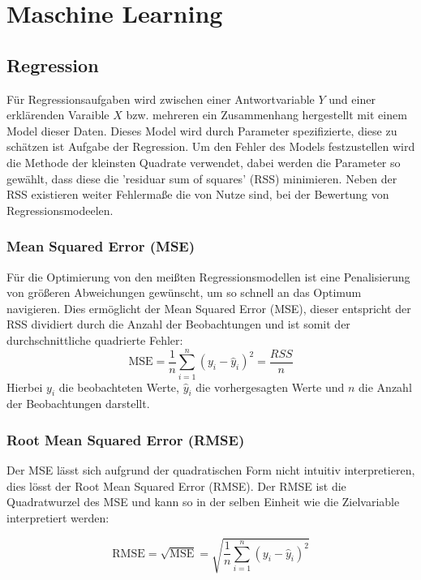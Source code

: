 
\section{Maschine Learning}
\label{sec:maschinelearning}
\subsection{Regression}
Für Regressionsaufgaben wird zwischen einer Antwortvariable \(Y\) und einer erklärenden Varaible \(X\) bzw. mehreren ein Zusammenhang hergestellt mit einem Model dieser Daten. Dieses Model wird durch Parameter spezifizierte, diese zu schätzen ist Aufgabe der Regression. Um den Fehler des Models festzustellen wird die Methode der kleinsten Quadrate verwendet, dabei werden die Parameter so gewählt, dass diese die 'residuar sum of squares' (RSS) minimieren. Neben der RSS existieren weiter Fehlermaße die von Nutze sind, bei der Bewertung von Regressionsmodeelen.

\subsubsection{Mean Squared Error (MSE)}
Für die Optimierung von den meißten Regressionsmodellen ist eine Penalisierung von größeren Abweichungen gewünscht, um so schnell an das Optimum navigieren. Dies ermöglicht der Mean Squared Error (MSE), dieser entspricht der RSS dividiert durch die Anzahl der Beobachtungen und ist somit der durchschnittliche quadrierte Fehler:
\begin{equation}
  \text{MSE} = \frac{1}{n} \sum_{i=1}^{n} (y_i - \hat{y}_i)^2 = \frac{RSS}{n}
  \label{eq:mse}
\end{equation}
Hierbei \(y_i\) die beobachteten Werte, \(\hat{y}_i\) die vorhergesagten Werte und \(n\) die Anzahl der Beobachtungen darstellt.

\subsubsection{Root Mean Squared Error (RMSE)}
Der MSE lässt sich aufgrund der quadratischen Form nicht intuitiv interpretieren, dies lösst der Root Mean Squared Error (RMSE). Der RMSE ist die Quadratwurzel des MSE und kann so in der selben Einheit wie die Zielvariable interpretiert werden:

\begin{equation}
  \text{RMSE} = \sqrt{\text{MSE}} = \sqrt{\frac{1}{n} \sum_{i=1}^{n} (y_i - \hat{y}_i)^2}
  \label{eq:rmse}
\end{equation}


